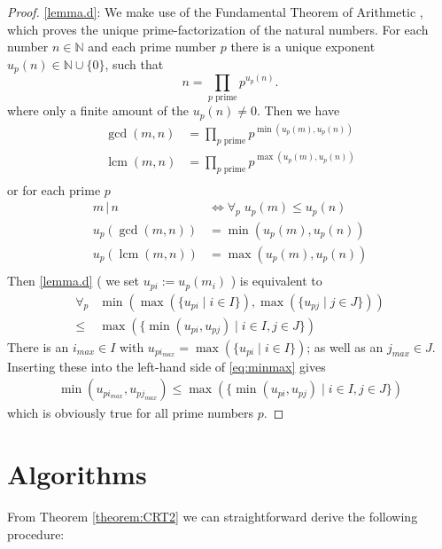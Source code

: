\documentclass[12pt]{article}
\providecommand{\divides}[2]{#1 \, \lvert \, #2}
\providecommand{\set}[2]{\{ #1 \mid #2 \}}
\providecommand{\up}[1]{u_p\left(#1\right)}
\providecommand{\gcdc}[1]{\gcd\left(#1\right)}
\providecommand{\lcmc}[1]{\lcm\left(#1\right)}
\providecommand{\minc}[1]{\min\left(#1\right)}
\providecommand{\maxc}[1]{\max\left(#1\right)}
\def\coloneqq{:=}
\def\N{\mathbb{N}}
\DeclareMathOperator{\lcm}{lcm}
\begin{document}
\begin{proof}
		 \eqref{lemma.d}: We make use of the Fundamental Theorem of Arithmetic \cite[chapter 1.2.4, exercise ~21]{Knuth1}, which proves the unique prime-factorization of the natural numbers. For each number $n \in \N$ and each prime number $p$ there is a unique exponent $\up{n} \in \N \cup \{0\}$, such that $$ n = \prod_{p \text{ prime}} p^{\up{n}}.$$ where only a finite amount of the $u_p\left(n\right) \ne 0$. Then we have
		 \begin{align*}
			 \gcdc{m, n} &= \prod_{p \text{ prime}} p^{\minc{\up{m}, \up{n}}}\\
			 \lcmc{m, n} &= \prod_{p \text{ prime}} p^{\maxc{\up{m}, \up{n}}}\\
		 \end{align*}
		 or for each prime $p$
		 \begin{align*}
			 \divides{m}{n} &\iff \forall_p \; \up{m} \le \up{n}\\
			 \up{\gcdc{m, n}} &= \minc{\up{m}, \up{n}}\\
			 \up{\lcmc{m, n}} &= \maxc{\up{m}, \up{n}}\\
		\end{align*}
		Then \eqref{lemma.d} ( we set $u_{pi} \coloneqq \up{m_i}$ ) is equivalent to  
		\begin{equation}\label{eq:minmax}
		\begin{split}
			\forall_p &\minc{\maxc{\set{u_{pi}}{i \in I}}, \maxc{\set{u_{pj}}{j \in J}}}\\
			\le &\maxc{\set{\minc{u_{pi}, u_{pj}}}{i \in I, j \in J}}
		\end{split}
		\end{equation}
		There is an $i_{max} \in I$ with $ u_{pi_{max}} = \maxc{\set{u_{pi}}{i \in I}}$; as well as an $j_{max} \in J$. Inserting these into the left-hand side of \eqref{eq:minmax} gives
		\begin{align*}
			\minc{u_{pi_{max}}, u_{pj_{max}}} \le \maxc{\set{\minc{u_{pi}, u_{pj}}}{i \in I, j \in J}}
		\end{align*}
		which is obviously true for all prime numbers $p$.
\end{proof}


\section{Algorithms}

From Theorem \ref{theorem:CRT2} we can straightforward derive the following procedure:
\end{document}
